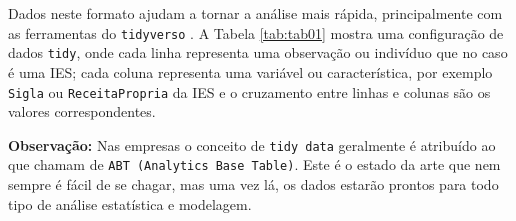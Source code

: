 \documentclass[11pt,]{style/krantz}
\makeatletter
\newenvironment{Shaded}{\begin{snugshade}}{\end{snugshade}}
\newcommand{\CommentTok}[1]{\textcolor[rgb]{0.56,0.35,0.01}{\textit{#1}}}
\newcommand{\DataTypeTok}[1]{\textcolor[rgb]{0.13,0.29,0.53}{#1}}
\newcommand{\DecValTok}[1]{\textcolor[rgb]{0.00,0.00,0.81}{#1}}
\newcommand{\KeywordTok}[1]{\textcolor[rgb]{0.13,0.29,0.53}{\textbf{#1}}}
\newcommand{\NormalTok}[1]{#1}
\newcommand{\OperatorTok}[1]{\textcolor[rgb]{0.81,0.36,0.00}{\textbf{#1}}}
\newcommand{\OtherTok}[1]{\textcolor[rgb]{0.56,0.35,0.01}{#1}}
\newcommand{\StringTok}[1]{\textcolor[rgb]{0.31,0.60,0.02}{#1}}
\newenvironment{kframe}{%
\medskip{}
\setlength{\fboxsep}{.8em}
 \def\at@end@of@kframe{}%
 \ifinner\ifhmode%
  \def\at@end@of@kframe{\end{minipage}}%
  \begin{minipage}{\columnwidth}%
 \fi\fi%
 \def\FrameCommand##1{\hskip\@totalleftmargin \hskip-\fboxsep
 \colorbox{shadecolor}{##1}\hskip-\fboxsep
     \hskip-\linewidth \hskip-\@totalleftmargin \hskip\columnwidth}%
 \MakeFramed {\advance\hsize-\width
   \@totalleftmargin\z@ \linewidth\hsize
   \@setminipage}}%
 {\par\unskip\endMakeFramed%
 \at@end@of@kframe}
\renewenvironment{Shaded}{\begin{kframe}}{\end{kframe}}
\theoremstyle{definition}
\theoremstyle{definition}
\theoremstyle{definition}
\theoremstyle{remark}
\makeatother
\begin{document}
Dados neste formato ajudam a tornar a análise mais rápida, principalmente com as ferramentas do \texttt{tidyverso} \citep{wickham2017tidyverse}. A Tabela \ref{tab:tab01} mostra uma configuração de dados \texttt{tidy}, onde cada linha representa uma observação ou indivíduo que no caso é uma IES; cada coluna representa uma variável ou característica, por exemplo \texttt{Sigla} ou \texttt{ReceitaPropria} da IES e o cruzamento entre linhas e colunas são os valores correspondentes.

\textbf{Observação:} Nas empresas o conceito de \texttt{tidy\ data} geralmente é atribuído ao que chamam de \texttt{ABT\ (Analytics\ Base\ Table)}. Este é o estado da arte que nem sempre é fácil de se chagar, mas uma vez lá, os dados estarão prontos para todo tipo de análise estatística e modelagem.

\begin{Shaded}
\end{Shaded}
\end{document}
